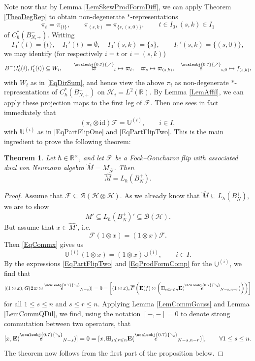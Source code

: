 \documentclass[11pt, reqno]{amsart}
\newtheorem{theorem}{Theorem}[section]
\theoremstyle{definition}
\numberwithin{equation}{section}
\newcommand{\hr}[1]{\left(#1\right)}                                                    %
\def\le{\leqslant}
\def\R{\mathbb R}
\newcommand{\Hsp}{\mathcal{H}}
\newcommand{\Bc}{\mathcal{B}}
\newcommand{\eb}{\mathbf{E}}
\newcommand{\bbU}{\mathbb{U}}
\newcommand{\Fct}{\mathcal{F}}
\newcommand{\Bor}{B}
\newcommand{\nears}{\scaleobj{0.7}{\nearrow}}
\newcommand{\sears}{\scaleobj{0.7}{\searrow}}
\newcommand{\nee}{\overset{\nears}{e}}
\newcommand{\seee}{\overset{\sears}{e}}
\newcommand{\nevarpi}{\overset{\nears}{\varpi}}
\newcommand{\id}{\mathrm{id}}
\newcommand{\wwbtd}[1]{\Bor^-_{#1}}
\newcommand{\wwwbtd}[1]{\Bor^+_{#1}}
\begin{document}
Note now that by Lemma \ref{LemSkewProdFormDiff}, we can apply Theorem \ref{TheoDegRep} to obtain non-degenerate $*$-representations
\begin{equation}\label{EqProjMapsPii}
\pi_t = \pi_{\{t\}},\qquad \pi_{(s,k)} = \pi_{\{s,(s,0)\}},\qquad t\in I_0, (s,k)\in I_1
\end{equation}
of $C_{\hbar}^*(\wwbtd{N,+})$. Writing 
\[
I_0'(t) = \{t\},\quad I_1'(t) = \emptyset,\quad I_0'(s,k) = \{s\},\qquad I_1'(s,k)= \{(s,0)\},
\]
we may identify (for respectively $i = t$ or $i = (s,k)$)  
\[
\wwbtd{}(I_0'(i),I_1'(i)) \subseteq W_i,\qquad \nevarpi_t \mapsto \varpi_t,\quad \varpi_s \mapsto \varpi_{(s,k)},\quad \nee_{s,0}\mapsto f_{(s,k)},
\]
with $W_i$ as in \eqref{EqDirSum}, and hence view the above $\pi_i$ as non-degenerate $*$-representations of $C_{\hbar}^*(\wwbtd{N,+})$ on $\Hsp_i = L^2(\R)$. By Lemma \ref{LemAffil}, we can apply these projection maps to the first leg of $\Fct$. Then one sees in fact immediately that 
\begin{equation}\label{EqProjFct}
(\pi_i \otimes \id)\Fct = \bbU^{(i)},\qquad i \in I, 
\end{equation}
with $\bbU^{(i)}$ as in \eqref{EqPartFlipOne} and \eqref{EqPartFlipTwo}. This is the main ingredient to prove the following theorem:

\begin{theorem}\label{TheovNFGFlip}
Let $\hbar\in \R^{\times}$, and let $\Fct$ be a Fock--Goncharov flip with associated dual von Neumann algebra $\hat{M} = M_{\hat{\Fct}}$. Then 
\[
\hat{M} = L_{\hbar}(\wwwbtd{N}).
\]
\end{theorem}
\begin{proof}
Assume that $\Fct \subseteq \Bc(\Hsp\otimes \Hsp)$. As we already know that $\hat{M} \subseteq L_{\hbar}(\wwwbtd{N})$, we are to show 
\[
\hat{M}'  \subseteq  L_{\hbar}(\wwwbtd{N})' \subseteq \Bc(\Hsp).
\]
But assume that $x \in \hat{M}'$, i.e.\ 
\begin{equation}\label{EqCommx}
\Fct(1\otimes x) = (1\otimes x) \Fct. 
\end{equation}
 Then \eqref{EqCommx} gives us 
\begin{equation}
\bbU^{(i)}(1\otimes x) = (1\otimes x)\bbU^{(i)},\qquad i\in I. 
\end{equation}
By the expressions \eqref{EqPartFlipTwo}  and \eqref{EqProdFormComp} for the $\bbU^{(i)}$, we find that 
\[
[(1\otimes x),G(2\varpi \otimes \seee_{N-s})]=0 = \left[(1\otimes x),\overline{F}\hr{\eb(f)\otimes  \left(\boxplus_{s \le r \le n} \eb(\seee_{N-s,n-r})\right)}\right]
\]
for all $1 \leq s \leq n$ and $s \leq r \leq n$. Applying Lemma \ref{LemCommGauss} and Lemma \ref{LemCommQDil}, we find, using the notation $[-,-]=0$ to denote strong commutation between two operators, that 
\[
[x,\eb(\seee_{N-s})]=0 = [x,\boxplus_{s \le r \le n} \eb(\seee_{N-s,n-r})],\qquad \forall 1\leq s\leq n.
\]
The theorem now follows from the first part of the proposition below. 
\end{proof}
\end{document}
